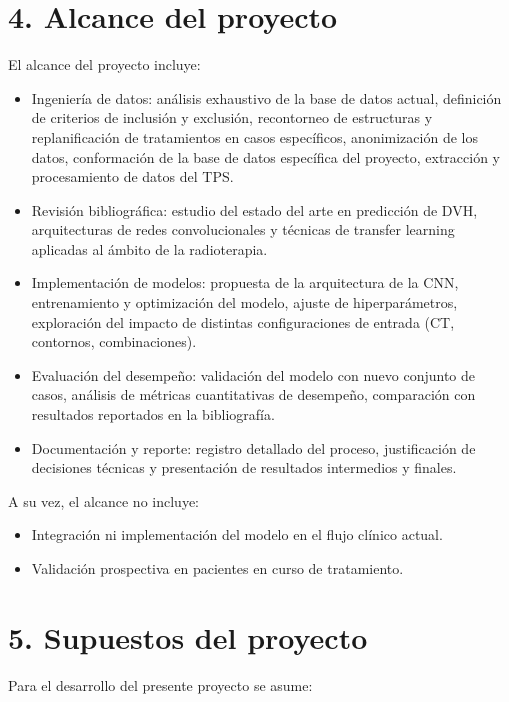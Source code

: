 \documentclass[
11pt, %
codirector, %
]{charter}
\begin{document}
\section{4. Alcance del proyecto}
\label{sec:alcance}

El alcance del proyecto incluye:
\begin{itemize}
	\item Ingeniería de datos: análisis exhaustivo de la base de datos actual, definición de criterios de inclusión y exclusión, recontorneo de estructuras y replanificación de tratamientos en casos específicos, anonimización de los datos, conformación de la base de datos específica del proyecto, extracción y procesamiento de datos del TPS.
	\item Revisión bibliográfica: estudio del estado del arte en predicción de DVH, arquitecturas de redes convolucionales y técnicas de transfer learning aplicadas al ámbito de la radioterapia.
	\item Implementación de modelos: propuesta de la arquitectura de la CNN, entrenamiento y optimización del modelo, ajuste de hiperparámetros, exploración del impacto de distintas configuraciones de entrada (CT, contornos, combinaciones).
	\item Evaluación del desempeño: validación del modelo con nuevo conjunto de casos, análisis de métricas cuantitativas de desempeño, comparación con resultados reportados en la bibliografía.
	\item Documentación y reporte: registro detallado del proceso, justificación de decisiones técnicas y presentación de resultados intermedios y finales.
	
\end{itemize}

A su vez, el alcance no incluye:
\begin{itemize}
	\item Integración ni implementación del modelo en el flujo clínico actual.
	\item Validación prospectiva en pacientes en curso de tratamiento.
	
\end{itemize}


\section{5. Supuestos del proyecto}
\label{sec:supuestos}

Para el desarrollo del presente proyecto se asume:
\end{document}
